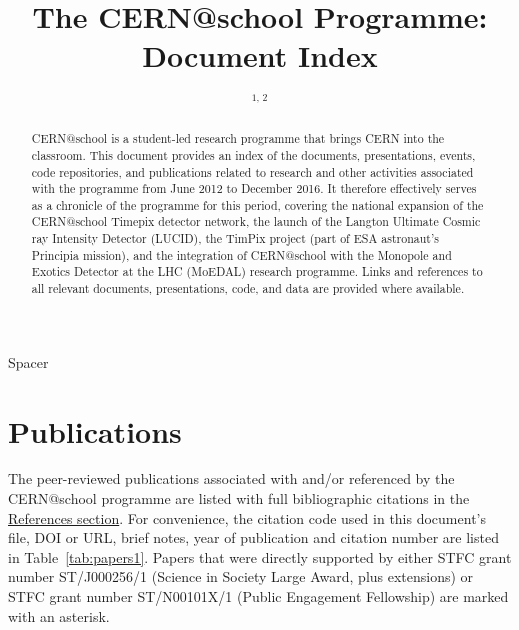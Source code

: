 \documentclass[12pt,a4paper]{iopart}
\begin{document}
%
%


\title{%
The CERN@school Programme: Document Index
}
% 
\author{\theauthorinit$^{1, \, 2}$}
%
\address{$^1$\theauthoraddressA}
\address{$^2$\theauthoraddressB}
\ead{\mailto{\theauthoremail}}

\begin{abstract}
CERN@school is a student-led research programme that brings
CERN into the classroom.
This document provides an index of the
documents,
presentations,
events,
code repositories,
and
publications
related to research and other activities associated with the
programme from June 2012 to December 2016.
It therefore effectively serves as a chronicle of the programme
for this period, covering the national expansion of the CERN@school Timepix detector
network, the launch of the Langton Ultimate Cosmic ray Intensity Detector (LUCID),
the TimPix project (part of ESA astronaut's Principia mission),
and the integration of CERN@school with the Monopole and Exotics Detector
at the LHC (MoEDAL) research programme.
Links and references to all relevant documents, presentations, code, and data
are provided where available.
\end{abstract}
%

{\color{white}Spacer}
\\[4cm]



\clearpage

\setcounter{tocdepth}{2}
\tableofcontents

\clearpage



\clearpage



\clearpage



\clearpage


\section{Publications}
\label{sec:publications}
The peer-reviewed publications associated with and/or referenced by
the CERN@school programme are listed with full bibliographic citations in the
\hyperref[sec:references]{References section}.
%
For convenience,
the  citation code used in this document's  file,
DOI or URL, brief notes, year of publication and citation number
are listed in Table~\ref{tab:papers1}.
%
Papers that were directly supported by either
STFC grant number ST/J000256/1
(Science in Society Large Award, plus extensions)
or
STFC grant number ST/N00101X/1
(Public Engagement Fellowship)
are marked with an asterisk.
\end{document}
